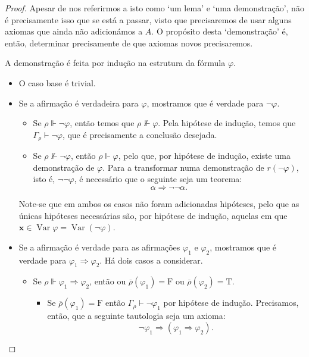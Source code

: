 \documentclass{report}
\theoremstyle{definition}
\theoremstyle{remark}
\renewcommand{\bf}[1]{\mathbf{#1}}
\newcommand{\lt}{\mathrm{T}}
\newcommand{\lf}{\mathrm{F}}
\DeclareMathOperator{\var}{Var}
\newcommand{\imply}{\mathbin{\Rightarrow}}
\begin{document}
	\begin{proof}
	Apesar de nos referirmos a isto como `um lema' e `uma demonstração', não é precisamente isso que se está a passar, visto que precisaremos de usar alguns axiomas que ainda não adicionámos a $A$. O propósito desta `demonstração' é, então, determinar precisamente de que axiomas novos precisaremos.
	
	A demonstração é feita por indução na estrutura da fórmula $\varphi$.
	
	\begin{itemize}
	\item O caso base é trivial.
	
	\item Se a afirmação é verdadeira para $\varphi$, mostramos que é verdade para $\neg \varphi$.
	
	\begin{itemize}
	\item Se $\rho \Vdash \neg \varphi$, então temos que $\rho \nVdash \varphi$. Pela hipótese de indução, temos que $\Gamma_\rho \vdash \neg \varphi$, que é precisamente a conclusão desejada.
	
	\item Se $\rho \nVdash \neg \varphi$, então $\rho \Vdash \varphi$, pelo que, por hipótese de indução, existe uma demonstração de $\varphi$. Para a transformar numa demonstração de $r(\neg \varphi)$, isto é, $\neg \neg \varphi$, é necessário que o seguinte seja um teorema:
	\[\alpha \imply \neg \neg \alpha.\]
	\end{itemize}
	
	Note-se que em ambos os casos não foram adicionadas hipóteses, pelo que as únicas hipóteses necessárias são, por hipótese de indução, aquelas em que $\bf x \in \var \varphi = \var(\neg \varphi)$.
	
	\item Se a afirmação é verdade para as afirmações $\varphi_1$ e $\varphi_2$, mostramos que é verdade para $\varphi_1 \imply \varphi_2$. Há dois casos a considerar.
	
	\begin{itemize}
	\item Se $\rho \Vdash \varphi_1 \imply \varphi_2$, então ou $\overline\rho(\varphi_1) = \lf$ ou $\overline\rho(\varphi_2) = \lt$.
	\begin{itemize}
	\item Se $\overline\rho(\varphi_1) = \lf$ então $\Gamma_\rho \vdash \neg \varphi_1$ por hipótese de indução. Precisamos, então, que a seguinte tautologia seja um axioma:
	\[\neg \varphi_1 \imply (\varphi_1 \imply \varphi_2).\]
	

\end{itemize}
\end{itemize}
\end{itemize}
\end{proof}
\end{document}
